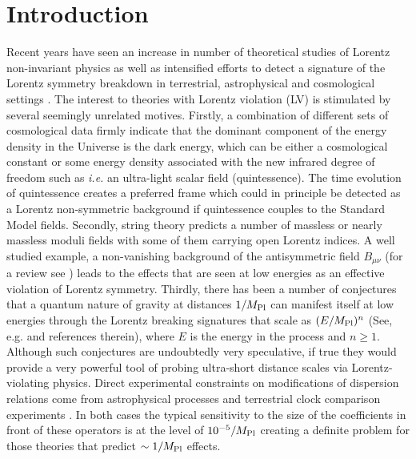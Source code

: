 \documentclass[12pt]{revtex4}
\begin{document}
\newpage

\setcounter{footnote}{0}
\setcounter{equation}{0}


\section{Introduction}
\label{Intro}

Recent years have seen an increase in number of theoretical studies 
of Lorentz non-invariant physics as well as intensified efforts to detect
a signature of the Lorentz symmetry breakdown  in terrestrial, astrophysical and
cosmological settings \cite{Kost1,CG,Jacobsonreview,PhysToday}. The interest to 
theories with Lorentz violation (LV) is stimulated by several seemingly 
unrelated motives. Firstly, a combination of different sets of 
cosmological data firmly indicate that the dominant 
component of the energy density in the Universe is the dark energy, 
which can be either a cosmological constant or some energy density 
associated with the new infrared degree of freedom such as {\em i.e.} 
an ultra-light scalar field (quintessence). 
The time evolution of quintessence creates a preferred frame 
which could in principle be detected as a Lorentz non-symmetric background if 
quintessence couples to the Standard Model fields. 
Secondly, string theory predicts a number of massless or nearly massless 
moduli fields with some of them carrying open Lorentz indices. A well studied 
example, a non-vanishing background of the antisymmetric field $B_{\mu\nu}$
(for a review see \cite{DN})
leads to the effects that are seen at low energies as an effective 
violation of Lorentz symmetry. Thirdly, there has been a number of 
conjectures that a quantum nature of gravity at distances $1/M_{\rm Pl}$ 
can manifest itself at low energies through the  Lorentz breaking signatures 
that scale as $(E/M_{\rm Pl})^n$ (See, e.g. \cite{lcq} and references therein), 
where $E$ is the energy in 
the process and $n \geq 1$. Although such conjectures are undoubtedly 
very speculative, if true they would provide a very powerful tool of probing 
ultra-short distance scales via Lorentz-violating physics.  Direct experimental constraints on 
modifications of dispersion relations come from astrophysical processes 
\cite{CFJ,AmC,Ted1,GK,Kost2,Sarkar} and terrestrial 
clock comparison experiments \cite{clock1,clock2,Vuc,MP:}. In both cases the 
typical sensitivity to the size of the coefficients in 
front of these operators is at the level of $10^{-5}/M_{\rm Pl}$ creating 
a definite problem for those theories that predict $\sim 1/M_{\rm Pl}$ effects.
\end{document}
